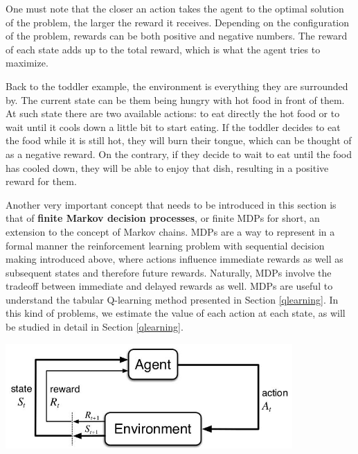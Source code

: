 \documentclass[11pt]{article}
\theoremstyle{definition}
\begin{document}
One must note that the closer an action takes the agent to the optimal solution of the problem, the larger the reward it receives. Depending on the configuration of the problem, rewards can be both positive and negative numbers. The reward of each state adds up to the total reward, which is what the agent tries to maximize.

Back to the toddler example, the environment is everything they are surrounded by. The current state can be them being hungry with hot food in front of them. At such state there are two available actions: to eat directly the hot food or to wait until it cools down a little bit to start eating. If the toddler decides to eat the food while it is still hot, they will burn their tongue, which can be thought of as a negative reward. On the contrary, if they decide to wait to eat until the food has cooled down, they will be able to enjoy that dish, resulting in a positive reward for them.

Another very important concept that needs to be introduced in this section is that of \textbf{finite Markov decision processes}, or finite MDPs for short, an extension to the concept of Markov chains. MDPs are a way to represent in a formal manner the reinforcement learning problem with sequential decision making introduced above, where actions influence immediate rewards as well as subsequent states and therefore future rewards. Naturally, MDPs involve the tradeoff between immediate and delayed rewards as well. MDPs are useful to understand the tabular Q-learning method presented in Section \ref{qlearning}. In this kind of problems, we estimate the value of each action at each state, as will be studied in detail in Section \ref{qlearning}.

\begin{center}
    \centering
    \includegraphics[width=\textwidth, height=4cm, keepaspectratio=true]{images/interaction_mdps.jpeg}
    \label{fig:coloring}
\end{center}
\end{document}
